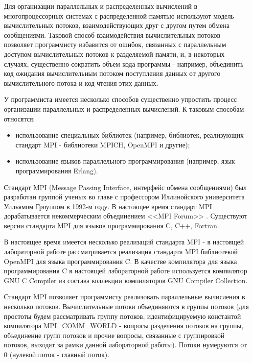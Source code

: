 

Для организации параллельных и распределенных вычислений в многопроцессорных системах с распределенной памятью используют модель вычислительных потоков, взаимодействующих друг с другом путем обмена сообщениями. Таковой способ взаимодействия вычислительных потоков позволяет программисту избавится от ошибок, связанных с параллельным доступом вычислительных потоков к разделяемой памяти, и, в некоторых случаях, существенно сократить объем кода программы - например, объединить код ожидания вычислительным потоком поступления данных от другого вычислительного потока и код чтения этих данных.

У программиста имеется несколько способов существенно упростить процесс организации параллельных и распределенных вычислений. К таковым способам относятся:

\begin{itemize}
	
	\item использование специальных библиотек (например, библиотек, реализующих стандарт MPI - библиотеки MPICH, OpenMPI и другие);
	\item использование языков параллельного программирования (например, язык программирования Erlang).

\end{itemize}


Стандарт MPI (Message Passing Interface, интерфейс обмена сообщениями) был разработан группой ученых во главе с профессором Иллинойского университета Уильямом Гроуппом в 1992-м году. В настоящее время стандарт MPI дорабатывается некоммерческим объединением <<MPI Forum>> \cite{mpi-forum}. Существуют версии стандарта MPI для языков программирования C, C++, Fortran.

В настоящее время имеется несколько реализаций стандарта MPI - в настоящей лабораторной работе рассматривается реализация стандарта MPI библиотекой OpenMPI для языка программирования C. В качестве компилятора для языка программирования C в настоящей лабораторной работе используется компилятор GNU C Compiler из состава коллекции компиляторов GNU Compiler Collection.

Стандарт MPI позволяет программисту реализовать параллельные вычисления в несколько потоков. Вычислительные потоки объединяются в группы потоков (для простоты будем рассматривать группу потоков, идентифицируемую константой компилятора MPI\_COMM\_WORLD - вопросы разделения потоков на группы, объединение групп потоков и прочие вопросы, связанные с группировкой потоков, выходят за рамки данной лабораторной работы). Потоки нумеруются от 0 (нулевой поток - главный поток).

